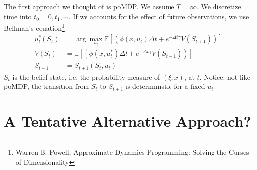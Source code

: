 \documentclass[a4paper,onecolumn]{article}
\begin{document}
\noindent The first approach we thought of is poMDP. We assume $T=
\infty$.
We discretize time into $t_0=0, t_1, \cdots $.
If we accounts for the effect of future observations, we use Bellman's
equation\footnote{Warren B. Powell, Approximate Dynamics Programming:
Solving the Curses of Dimensionality}
\begin{equation}\begin{split}
  u_t^*(S_t) &= \arg\max_{u_t} \mathbb{E}\left[\left(\phi(x, u_t)\Delta
  t+ e^{-\Delta t \gamma}
  V(S_{t+1})\right)\right]\\
  V(S_t) &= \mathbb{E}\left[\left(\phi(x, u^*_t)\Delta
    t+ e^{-\Delta t \gamma}
	  V(S_{t+1})\right)\right]\\
  S_{t+1} &= S_{t+1}(S_t, u_t)
\end{split}\end{equation}
$S_t$ is the belief state, i.e. the probability measure of $(\xi,x)$, at $t$.
Notice: not like poMDP, the transition from $S_t$ to $S_{t+1}$ is
deterministic for a fixed $u_t$.\\

\section{A Tentative Alternative Approach?}
\end{document}
